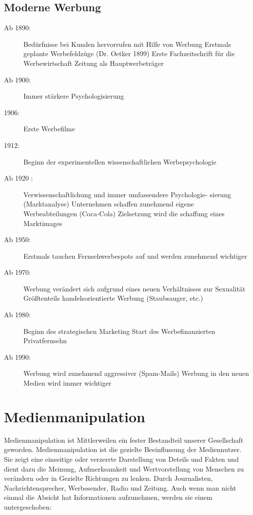 \subsection{Moderne Werbung}
\begin{description}
	\item[Ab 1890:] Bedürfnisse bei Kunden hervorrufen mit Hilfe von Werbung
Erstmals geplante Werbefeldzüge (\zB Dr. Oetker 1899)
Erste Fachzeitschrift für die Werbewirtschaft
Zeitung als Hauptwerbeträger

	\item[Ab 1900:] Immer stärkere Psychologisierung
	\item[1906:] Erste Werbefilme
	\item[1912:] Beginn der experimentellen wissenschaftlichen
Werbepsychologie
	\item[Ab 1920	:] Verwissenschaftlichung und immer umfassendere Psychologie-
sierung (Marktanalyse)
Unternehmen schaffen zunehmend eigene Werbeabteilungen
(Coca-Cola)
Zielsetzung wird die schaffung eines Marktimages
	\item[Ab 1950:] Erstmals tauchen Fernsehwerbespots auf und werden zunehmend wichtiger
	\item[Ab 1970:] Werbung verändert sich aufgrund eines neuen Verhältnisses zur Sexualität
	Größtenteils handelsorientierte Werbung (Staubsauger, etc.)

	\item[Ab 1980:] Beginn des strategischen Marketing
	Start des Werbefinanzierten Privatfernsehn

	\item[Ab 1990:] Werbung wird zunehmend aggressiver (\zB Spam-Mails)
	Werbung in den neuen Medien wird immer wichtiger
\end{description}

\section{Medienmanipulation}
Medienmanipulation ist Mittlerweilen ein fester Bestandteil unserer Gesellschaft
geworden. Medienmanipulation ist die gezielte Beeinflussung der Mediennutzer. Sie zeigt
eine einseitige oder verzerrte Darstellung von Deteils und Fakten und dient dazu
die Meinung, Aufmerksamkeit und Wertvorstellung von Menschen zu verändern oder in
Gezielte Richtungen zu lenken. Durch Journalisten, Nachrichtensprecher, Werbesender,
Radio und Zeitung. Auch wenn man nicht einmal die Absicht hat Informationen aufzunehmen, werden sie
einem untergeschoben:

